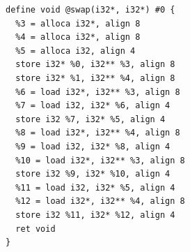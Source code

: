 \documentclass{jarticle}
\begin{document}
\begin{Verbatim}
define void @swap(i32*, i32*) #0 {
  %3 = alloca i32*, align 8
  %4 = alloca i32*, align 8
  %5 = alloca i32, align 4
  store i32* %0, i32** %3, align 8
  store i32* %1, i32** %4, align 8
  %6 = load i32*, i32** %3, align 8
  %7 = load i32, i32* %6, align 4
  store i32 %7, i32* %5, align 4
  %8 = load i32*, i32** %4, align 8
  %9 = load i32, i32* %8, align 4
  %10 = load i32*, i32** %3, align 8
  store i32 %9, i32* %10, align 4
  %11 = load i32, i32* %5, align 4
  %12 = load i32*, i32** %4, align 8
  store i32 %11, i32* %12, align 4
  ret void
}
\end{Verbatim}
\end{document}
